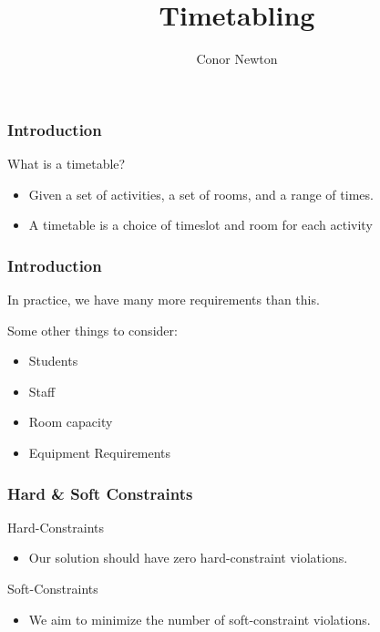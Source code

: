 \documentclass{beamer}
\title{Timetabling}
\author{Conor Newton}
\begin{document}
\begin{frame}
	\titlepage
\end{frame}

\begin{frame}
	\frametitle{Introduction}
	
	What is a timetable?
	
	\begin{itemize}
		\item Given a set of activities, a set of rooms, and a range of times.
		\item A timetable is a choice of timeslot and room for each activity
	\end{itemize}
\end{frame}


\begin{frame}
	\frametitle{Introduction}
	In practice, we have many more requirements than this.
	
	Some other things to consider:
	
	\begin{itemize}
		\item Students
		\item Staff
		\item Room capacity
		\item Equipment Requirements
	\end{itemize}
\end{frame}

\begin{frame}
	\frametitle{Hard \& Soft Constraints}
	Hard-Constraints
	
	\begin{itemize}
		\item Our solution should have zero hard-constraint violations.
	\end{itemize}

	Soft-Constraints
	
	\begin{itemize}
		\item We aim to minimize the number of soft-constraint violations.
	\end{itemize}
	
\end{frame}
\end{document}
